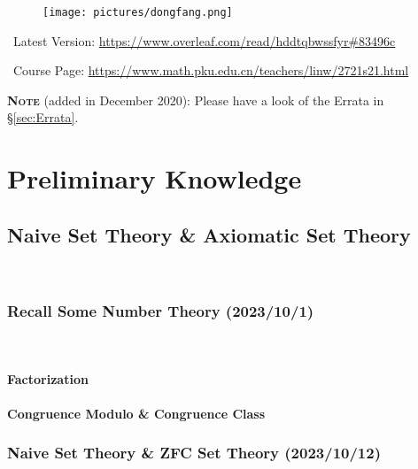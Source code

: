 \documentclass[12pt, a3paper, openany]{book}
\begin{document}
\begin{figure}[!b]
	\centering
	\texttt{[image: pictures/dongfang.png]}
	\vspace{11ex}
\end{figure}




\Pickup\ Latest Version: \url{https://www.overleaf.com/read/hddtqbwssfyr#83496c}

\Pickup\ Course Page: \url{https://www.math.pku.edu.cn/teachers/linw/2721s21.html}

\vspace{1em}
\textdbend\;\textbf{\textsc{Note}} (added in December 2020): Please have a look of the Errata in \S\ref{sec:Errata}.
\clearpage

\setcounter{page}{1}
\part{Preliminary Knowledge}

\chapter{Naive Set Theory \& Axiomatic Set Theory}
\\
\headrule
\startcontents
{}



\section{\bf Recall Some Number Theory \sf\scriptsize (2023/10/1)}\\

\subsection{Factorization}
\subsection{Congruence Modulo \& Congruence Class}

\section{Naive Set Theory \& ZFC Set Theory \sf\scriptsize (2023/10/12)}
\end{document}
